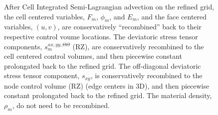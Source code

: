 \documentclass[]{article}
\begin{document}
\begin{figure}
\caption{
	After Cell Integrated Semi-Lagrangian 
	advection\cite{jemison2014compressible,scardovelli2003interface}
	on the refined grid, the cell centered variables,
	$F_{m}$, $\phi_{m}$, and $E_{m}$, and the face centered
	variables, $(u,v)$, are conservatively ``recombined'' back to their
	respective control voume locations.  The deviatoric stress tensor
	components, 
	$s_{m}^{xx,yy,\Theta\Theta}$ (RZ), 
	are conservatively 
	recombined to the cell centered control volumes, and then piecewise
	constant prolongated back to the refined grid.  The off-diagonal
	deviatoric stress tensor component, $s_{xy}$, is conservatively
	recombined to the node control volume (RZ) (edge centers in 3D), and
	then piecewise constant prolongated back to the refined grid.
	The material density, $\rho_{m}$, do not need to be recombined.
 \label{recombination}}
\end{figure}
\end{document}
